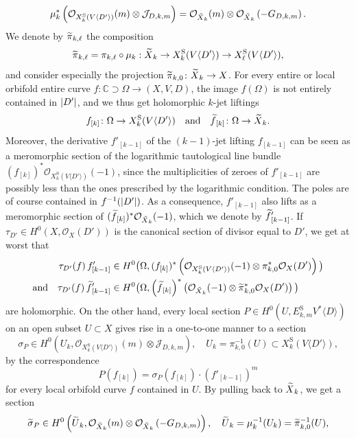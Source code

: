\documentclass[AHL,Unicode,longabstracts,published]{cedram}
\DeclarePairedDelimiter{\abs}{\lvert}{\rvert}
\newcommand*\rS{\mathrm{S}}
\newcommand*\cJ{\mathcal{J}}
\newcommand*\cO{\mathcal{O}}
\newcommand*\bC{\mathbb{C}}
\let\oldtilde\tilde
\renewcommand*{\tilde}[1]{\mathchoice{\widetilde{#1}}{\widetilde{#1}}{\oldtilde{#1}}{\oldtilde{#1}}}
\begin{document}
\[
\mu_k^*\left(\cO_{X^\rS_k(V\langle D'\rangle)}(m)\otimes\cJ_{D,k,m}\right)=
\cO_{\tilde X_k}(m)\otimes\cO_{\tilde X_k}\left(-G_{D,k,m}\right).
\]
We denote by $\tilde\pi_{k,\ell}$ the composition
\[
\tilde\pi_{k,\ell}=\pi_{k,\ell}\circ\mu_k:\tilde X_k\to X^\rS_k(V\langle D'\rangle)
\to X^\rS_\ell(V\langle D'\rangle),
\]
and consider especially the projection $\tilde\pi_{k,0}\colon\tilde X_k\to X$. For every entire or local orbifold entire curve
$f\colon\bC\supset\Omega\to(X,V,D)$, the image $f(\Omega)$ is not entirely contained in $\abs{D'}$, and we thus get holomorphic $k$-jet liftings
\[
f_{[k]}
\colon
\Omega
\to X^\rS_k(V\langle D'\rangle)
\text{\quad and\quad}
\tilde f_{[k]}
\colon
\Omega
\to
\tilde X_k.
\]
Moreover, the derivative $f'_{[k-1]}$ of the $(k-1)$-jet lifting
$f_{[k-1]}$ can be seen as a meromorphic section of the logarithmic tautological line bundle $(f_{[k]})^*\cO_{X^\rS_k(V\langle D'\rangle)}(-1)$, since the multipli\-cities of zeroes of $f'_{[k-1]}$ are possibly less than the ones prescribed by the logarithmic condition. The poles are of course contained in $f^{-1}(\abs{D'})$. As a consequence,
$f'_{[k-1]}$ also lifts as a meromorphic section of $(\tilde f_{[k]})^*\cO_{\tilde X_k}(-1)$, which we denote by $\tilde f'_{[k-1]}$. If $\tau_{D'}\in H^0(X,\cO_X(D'))$ is the canonical section of divisor equal to $D'$, we get at worst that
\begin{equation}\label{8.9}
\begin{aligned}
\tau_{D'}(f)\,f'_{[k-1]}&
\in H^0\big(
\Omega, (f_{[k]})^*\left(\cO_{X^\rS_k(V\langle D'\rangle)}(-1)\otimes \pi_{k,0}^*\cO_X(D')\right)
\big)\\
\text{and}\quad 
\tau_{D'}(f)\,\tilde f'_{[k-1]}&
\in H^0\big(\Omega, \left(\tilde f_{[k]}\right)^*\left(\cO_{\tilde X_k}(-1)\otimes\tilde\pi_{k,0}^*\cO_X(D')\right)
\big)
\end{aligned}
\end{equation}
are holomorphic. On the other hand, every local section $P\in H^0(U,E^\rS_{k,m}V^*\langle D\rangle)$ on an open subset $U\subset X$ gives rise in a one-to-one manner to a section
\[
\sigma_P\in H^0\left(U_k,\cO_{X^\rS_k(V\langle D'\rangle)}(m)
\otimes \cJ_{D,k,m}\right),\quad U_k=\pi_{k,0}^{-1}(U)\subset X^\rS_k(V\langle D'\rangle),
\]
by the correspondence
\[
P(f_{[k]}) =
\sigma_P(f_{[k]})\cdot \left(f'_{[k-1]}\right)^m
\]
for every local orbifold curve $f$ contained in $U$. By pulling back to $\tilde X_k$, we get a section
\[
\tilde\sigma_P\in H^0\left(\tilde U_k,\cO_{\tilde X_k}(m)
\otimes \cO_{\tilde X_k}\left(-G_{D,k,m}\right)\right),
\quad \tilde U_k=\mu_k^{-1}(U_k)=\tilde\pi_{k,0}^{-1}(U),
\]
\end{document}
